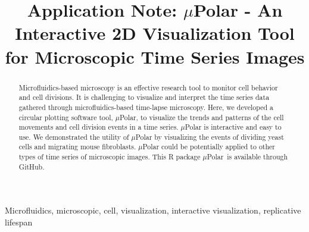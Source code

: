 \documentclass[conference]{IEEEtran}
\begin{document}
\title{ Application Note: $\mu$Polar \-- An Interactive 2D Visualization Tool for Microscopic Time Series Images }

 \author{
 \and
{}
 }

\maketitle
\begin{abstract}
Microfluidics-based microscopy is an effective research tool to monitor cell behavior and cell divisions. It is challenging to visualize and interpret the time series data gathered through microfluidics-based time-lapse  microscopy. Here, we developed a circular plotting software tool, $\mu$Polar, to visualize the trends and patterns of the cell movements and cell division events in a time series. $\mu$Polar is interactive and easy to use. We demonstrated the utility of $\mu$Polar by visualizing the events of dividing yeast cells and migrating mouse fibroblasts. $\mu$Polar could be potentially applied to other types of time series of microscopic images. This R package $\mu$Polar\ is available through GitHub.
\end{abstract}

\begin{IEEEkeywords}
Microfluidics, microscopic, cell, visualization, interactive visualization, replicative lifespan 
\end{IEEEkeywords}
\end{document}
